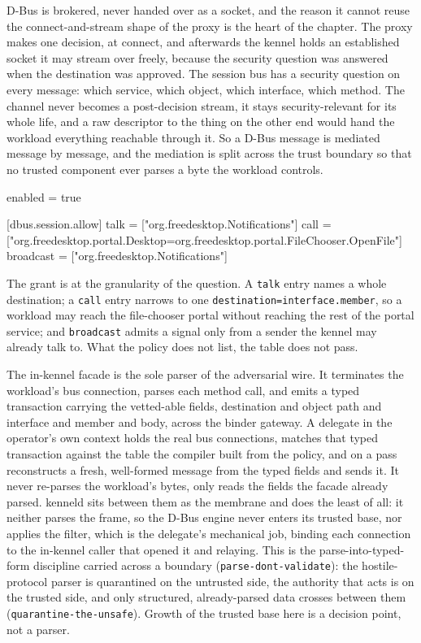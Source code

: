 D-Bus is brokered, never handed over as a socket, and the reason it
cannot reuse the connect-and-stream shape of the proxy is the heart of
the chapter. The proxy makes one decision, at connect, and afterwards
the kennel holds an established socket it may stream over freely,
because the security question was answered when the destination was
approved. The session bus has a security question on every message:
which service, which object, which interface, which method. The channel
never becomes a post-decision stream, it stays security-relevant for its
whole life, and a raw descriptor to the thing on the other end would
hand the workload everything reachable through it. So a D-Bus message is
mediated message by message, and the mediation is split across the trust
boundary so that no trusted component ever parses a byte the workload
controls.

\begin{kennelcode}
enabled = true

[dbus.session.allow]
talk = ["org.freedesktop.Notifications"]
call = ["org.freedesktop.portal.Desktop=org.freedesktop.portal.FileChooser.OpenFile"]
broadcast = ["org.freedesktop.Notifications"]
\end{kennelcode}

The grant is at the granularity of the question. A \texttt{talk} entry
names a whole destination; a \texttt{call} entry narrows to one
\texttt{destination=interface.member}, so a workload may reach the
file-chooser portal without reaching the rest of the portal service; and
\texttt{broadcast} admits a signal only from a sender the kennel may
already talk to. What the policy does not list, the table does not pass.

The in-kennel facade is the sole parser of the adversarial wire. It
terminates the workload's bus connection, parses each method call, and
emits a typed transaction carrying the vetted-able fields, destination
and object path and interface and member and body, across the binder
gateway. A delegate in the operator's own context holds the real bus
connections, matches that typed transaction against the table the
compiler built from the policy, and on a pass reconstructs a fresh,
well-formed message from the typed fields and sends it. It never
re-parses the workload's bytes, only reads the fields the facade already
parsed. kenneld sits between them as the membrane and does the least of
all: it neither parses the frame, so the D-Bus engine never enters its
trusted base, nor applies the filter, which is the delegate's mechanical
job, binding each connection to the in-kennel caller that opened it and
relaying. This is the parse-into-typed-form discipline carried across a
boundary (\texttt{parse-dont-validate}): the hostile-protocol parser is
quarantined on the untrusted side, the authority that acts is on the
trusted side, and only structured, already-parsed data crosses between
them (\texttt{quarantine-the-unsafe}). Growth of the trusted base here
is a decision point, not a parser.


